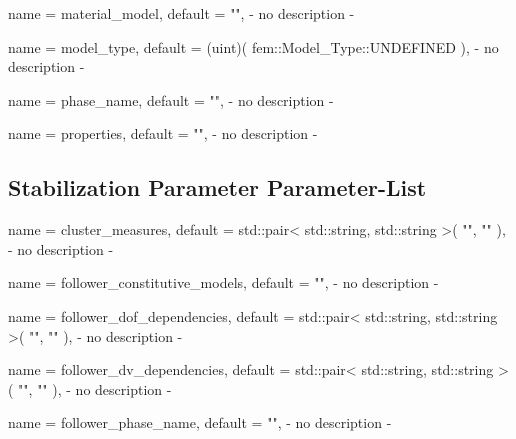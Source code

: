 \begin{parameter}{
    name    = {material_model},
    default = {""},
}
- no description -
\end{parameter}

\begin{parameter}{
    name    = {model_type},
    default = {(uint)( fem::Model_Type::UNDEFINED )},
}
- no description -
\end{parameter}

\begin{parameter}{
    name    = {phase_name},
    default = {""},
}
- no description -
\end{parameter}

\begin{parameter}{
    name    = {properties},
    default = {""},
}
- no description -
\end{parameter}

\subsection{Stabilization Parameter Parameter-List}

\begin{parameter}{
    name    = {cluster_measures},
    default = {std::pair< std::string, std::string >( "", "" )},
}
- no description -
\end{parameter}

\begin{parameter}{
    name    = {follower_constitutive_models},
    default = {""},
}
- no description -
\end{parameter}

\begin{parameter}{
    name    = {follower_dof_dependencies},
    default = {std::pair< std::string, std::string >( "", "" )},
}
- no description -
\end{parameter}

\begin{parameter}{
    name    = {follower_dv_dependencies},
    default = {std::pair< std::string, std::string >( "", "" )},
}
- no description -
\end{parameter}

\begin{parameter}{
    name    = {follower_phase_name},
    default = {""},
}
- no description -
\end{parameter}

